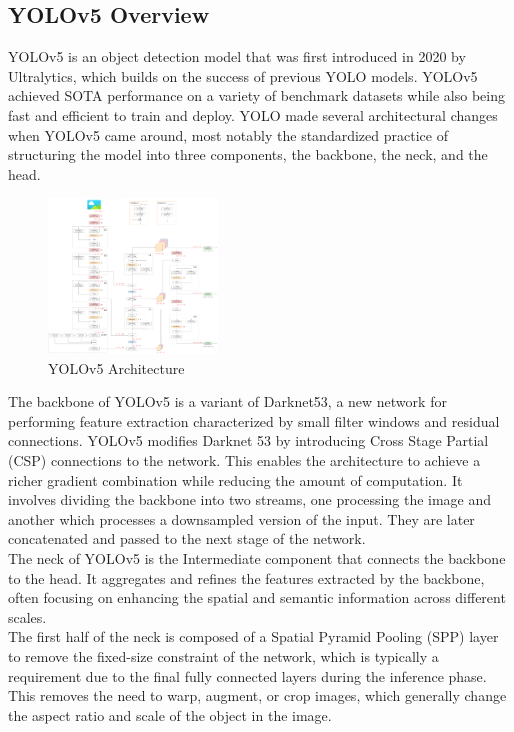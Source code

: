 \documentclass[10pt,twocolumn,letterpaper]{article}
\begin{document}
\subsection{YOLOv5 Overview}
YOLOv5 is an object detection model that was first introduced in 2020 by Ultralytics, which builds on the success of previous YOLO models. YOLOv5 achieved SOTA performance on a variety of benchmark datasets while also being fast and efficient to train and deploy. YOLO made several architectural changes when YOLOv5 came around, most notably the standardized practice of structuring the model into three components, the backbone, the neck, and the head.\\
\begin{figure}[h]
    \centering
    \includegraphics[width=0.4\textwidth]{figures/YOLOv5_arch.png}
    \caption{YOLOv5 Architecture}
    \label{fig:my_label}
\end{figure} 
The backbone of YOLOv5 is a variant of Darknet53, a new network for performing feature extraction characterized by small filter windows and residual connections. YOLOv5 modifies Darknet 53 by introducing Cross Stage Partial (CSP) connections to the network. This enables the architecture to achieve a richer gradient combination while reducing the amount of computation. It involves dividing the backbone into two streams, one processing the image and another which processes a downsampled version of the input. They are later concatenated and passed to the next stage of the network. \\
The neck of YOLOv5 is the Intermediate component that connects the backbone to the head. It aggregates and refines the features extracted by the backbone, often focusing on enhancing the spatial and semantic information across different scales. \\
The first half of the neck is composed of a Spatial Pyramid Pooling (SPP) layer to remove the fixed-size constraint of the network, which is typically a requirement due to the final fully connected layers during the inference phase. This removes the need to warp, augment, or crop images, which generally change the aspect ratio and scale of the object in the image. \\
\end{document}

